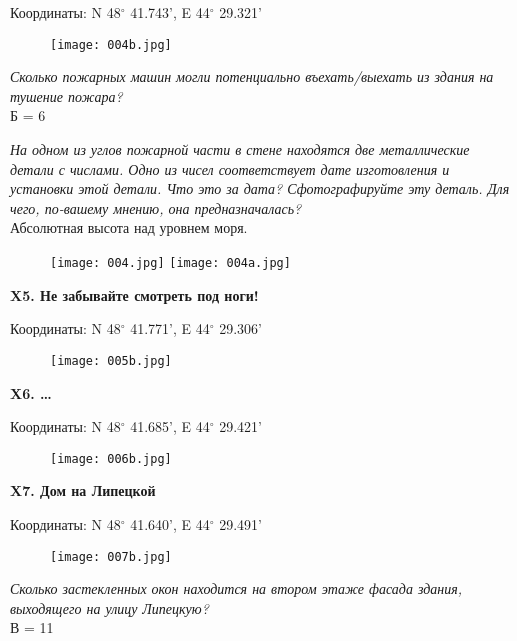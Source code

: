 \documentclass[pscyr]{hedwork}
\begin{document}
  Координаты: N 48\( ^\circ \) 41.743', E 44\( ^\circ \) 29.321'

  \begin{figure}[htbp]
    \center
    \texttt{[image: 004b.jpg]}
  \end{figure}

  \emph{Сколько пожарных машин могли потенциально въехать/выехать из здания на
  тушение пожара?} \\
  Б = 6

  \emph{На одном из углов пожарной части в стене находятся две металлические
  детали с числами. Одно из чисел соответствует дате изготовления и установки
  этой детали. Что это за дата? Сфотографируйте эту деталь. Для чего, по-вашему
  мнению, она предназначалась?} \\  
  Абсолютная высота над уровнем моря.

  \begin{figure}[htbp]
    \center
    \texttt{[image: 004.jpg]} \hfill
    \texttt{[image: 004a.jpg]}
  \end{figure}

  \pagebreak

  \textbf{X5. Не забывайте смотреть под ноги!}

  Координаты: N 48\( ^\circ \) 41.771', E 44\( ^\circ \) 29.306'

  \begin{figure}[htbp]
    \center
    \texttt{[image: 005b.jpg]}
  \end{figure}

  \pagebreak

  \textbf{X6. \ldots}

  Координаты: N 48\( ^\circ \) 41.685', E 44\( ^\circ \) 29.421'

  \begin{figure}[htbp]
    \center
    \texttt{[image: 006b.jpg]}
  \end{figure}

  \pagebreak

  \textbf{X7. Дом на Липецкой}

  Координаты: N 48\( ^\circ \) 41.640', E 44\( ^\circ \) 29.491'

  \begin{figure}[htbp]
    \center
    \texttt{[image: 007b.jpg]}
  \end{figure}

  \emph{Сколько застекленных окон находится на втором этаже фасада здания, 
  выходящего на улицу Липецкую?} \\
  В = 11
\end{document}
